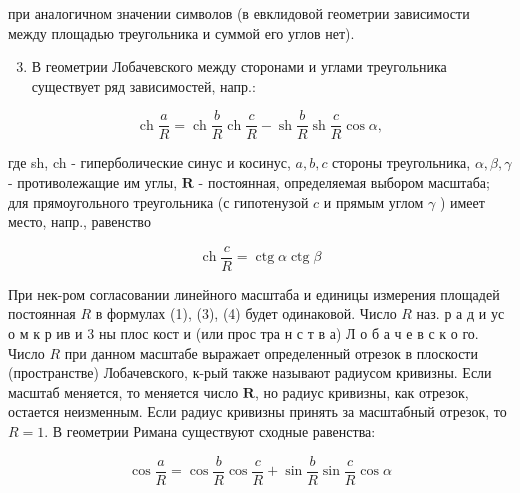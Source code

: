 \documentclass[10pt]{article}
\begin{document}
при аналогичном значении символов (в евклидовой геометрии зависимости между площадью треугольника и суммой его углов нет).



\begin{enumerate}

  \setcounter{enumi}{2}

  \item В геометрии Лобачевского между сторонами и углами треугольника существует ряд зависимостей, напр.:

\end{enumerate}



\[

\operatorname{ch} \frac{a}{R}=\operatorname{ch} \frac{b}{R} \operatorname{ch} \frac{c}{R}-\operatorname{sh} \frac{b}{R} \operatorname{sh} \frac{c}{R} \cos \alpha,

\]



где sh, ch - гиперболические синус и косинус, $a, b, c$ стороны треугольника, $\alpha, \beta, \gamma$ - противолежащие им углы, $\boldsymbol{R}$ - постоянная, определяемая выбором масштаба; для прямоугольного треугольника (с гипотенузой $c$ и прямым углом $\gamma$ ) имеет место, напр., равенство



\[

\operatorname{ch} \frac{c}{R}=\operatorname{ctg} \alpha \operatorname{ctg} \beta

\]



При нек-ром согласовании линейного масштаба и единицы измерения площадей постоянная $R$ в формулах (1), (3), (4) будет одинаковой. Число $R$ наз. р а д и ус о м к р ив и 3 ны плос кост и (или прос тра н с т в а) Л о б а ч е в с к о го. Число $R$ при данном масштабе выражает определенный отрезок в плоскости (пространстве) Лобачевского, к-рый также называют радиусом кривизны. Если масштаб меняется, то меняется число $\boldsymbol{R}$, но радиус кривизны, как отрезок, остается неизменным. Если радиус кривизны принять за масштабный отрезок, то $R=1$. В геометрии Римана существуют сходные равенства:



\[

\cos \frac{a}{R}=\cos \frac{b}{R} \cos \frac{c}{R}+\sin \frac{b}{R} \sin \frac{c}{R} \cos \alpha

\]
\end{document}
